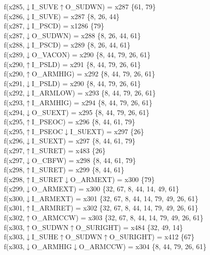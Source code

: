 f(x285,$\downarrow$I\_SUVE$\uparrow$O\_SUDWN) = x287 \{61, 79\} \\  
f(x286,$\downarrow$I\_SUVE) = x287 \{8, 26, 44\} \\  
f(x287,$\downarrow$I\_PSCD) = x1286 \{79\} \\  
f(x287,$\downarrow$O\_SUDWN) = x288 \{8, 26, 44, 61\} \\  
f(x288,$\downarrow$I\_PSCD) = x289 \{8, 26, 44, 61\} \\  
f(x289,$\downarrow$O\_VACON) = x290 \{8, 44, 79, 26, 61\} \\  
f(x290,$\uparrow$I\_PSLD) = x291 \{8, 44, 79, 26, 61\} \\  
f(x290,$\uparrow$O\_ARMHIG) = x292 \{8, 44, 79, 26, 61\} \\  
f(x291,$\downarrow$I\_PSLD) = x290 \{8, 44, 79, 26, 61\} \\  
f(x292,$\downarrow$I\_ARMLOW) = x293 \{8, 44, 79, 26, 61\} \\  
f(x293,$\uparrow$I\_ARMHIG) = x294 \{8, 44, 79, 26, 61\} \\  
f(x294,$\downarrow$O\_SUEXT) = x295 \{8, 44, 79, 26, 61\} \\  
f(x295,$\uparrow$I\_PSEOC) = x296 \{8, 44, 61, 79\} \\  
f(x295,$\uparrow$I\_PSEOC$\downarrow$I\_SUEXT) = x297 \{26\} \\  
f(x296,$\downarrow$I\_SUEXT) = x297 \{8, 44, 61, 79\} \\  
f(x297,$\uparrow$I\_SURET) = x483 \{26\} \\  
f(x297,$\downarrow$O\_CBFW) = x298 \{8, 44, 61, 79\} \\  
f(x298,$\uparrow$I\_SURET) = x299 \{8, 44, 61\} \\  
f(x298,$\uparrow$I\_SURET$\downarrow$O\_ARMEXT) = x300 \{79\} \\  
f(x299,$\downarrow$O\_ARMEXT) = x300 \{32, 67, 8, 44, 14, 49, 61\} \\  
f(x300,$\downarrow$I\_ARMEXT) = x301 \{32, 67, 8, 44, 14, 79, 49, 26, 61\} \\  
f(x301,$\uparrow$I\_ARMRET) = x302 \{32, 67, 8, 44, 14, 79, 49, 26, 61\} \\  
f(x302,$\uparrow$O\_ARMCCW) = x303 \{32, 67, 8, 44, 14, 79, 49, 26, 61\} \\  
f(x303,$\uparrow$O\_SUDWN$\uparrow$O\_SURIGHT) = x484 \{32, 49, 14\} \\  
f(x303,$\downarrow$I\_SUHE$\uparrow$O\_SUDWN$\uparrow$O\_SURIGHT) = x412 \{67\} \\  
f(x303,$\downarrow$O\_ARMHIG$\downarrow$O\_ARMCCW) = x304 \{8, 44, 79, 26, 61\} \\  
